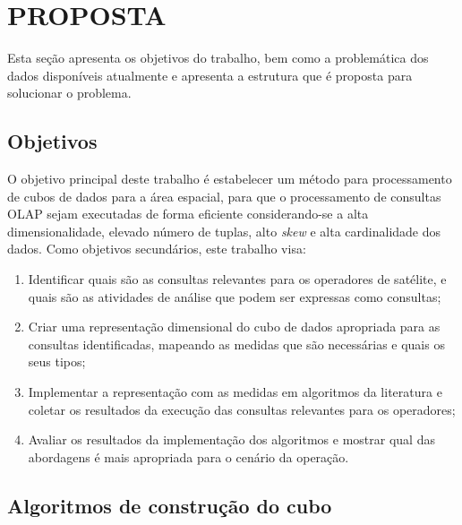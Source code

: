 
\chapter{PROPOSTA}\label{ch:prop}

{\color{cerulean}
Esta seção apresenta os objetivos do trabalho, bem como a problemática dos dados disponíveis atualmente e apresenta a estrutura que é proposta para solucionar o problema.
}

\section{Objetivos}\label{ch:prop:obj}

{\color{cerulean}

O objetivo principal deste trabalho é estabelecer um método para processamento de cubos de dados para a área espacial, para que o processamento de consultas OLAP sejam executadas de forma eficiente considerando-se a alta dimensionalidade, elevado número de tuplas, alto \textit{skew} e alta cardinalidade dos dados.
Como objetivos secundários, este trabalho visa:

\begin{enumerate}
\item Identificar quais são as consultas relevantes para os operadores de satélite, e quais são as atividades de análise que podem ser expressas como consultas;
\item Criar uma representação dimensional do cubo de dados apropriada para as consultas identificadas, mapeando as medidas que são necessárias e quais os seus tipos;
\item Implementar a representação com as medidas em algoritmos da literatura e coletar os resultados da execução das consultas relevantes para os operadores;
\item Avaliar os resultados da implementação dos algoritmos e mostrar qual das abordagens é mais apropriada para o cenário da operação.
\end{enumerate}

}

\section{Algoritmos de construção do cubo}\label{ch:prop:cube}

